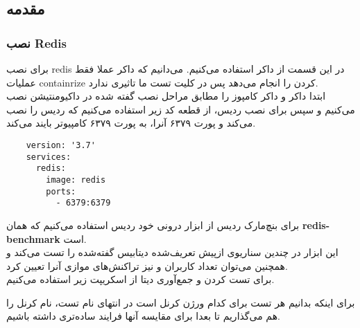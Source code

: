 \subsection{مقدمه}
\subsubsection{نصب Redis}
برای نصب 
redis 
در این قسمت از داکر
استفاده می‌کنیم.
می‌دانیم که داکر 
عملا فقط عملیات 
containrize 
کردن را انجام
می‌دهد
پس  در کلیت تست ما 
تاثیری ندارد.
\\
ابتدا داکر و داکر کامپوز را مطابق مراحل نصب گفته شده در
داکیومنتیشن نصب می‌کنیم و سپس 
برای نصب ردیس، از قطعه کد زیر استفاده می‌کنیم که 
ردیس را نصب می‌کند و پورت ۶۳۷۹ آنرا، به پورت ۶۳۷۹ کامپیوتر بایند می‌کند.
\begin{latin}
  \begin{verbatim}
    version: '3.7'
    services:
      redis:
        image: redis
        ports:
          - 6379:6379    
  \end{verbatim}
\end{latin}
برای بنچ‌مارک ردیس از ابزار درونی خود ردیس استفاده می‌کنیم که همان 
\textbf{redis-benchmark}
است.
\\
این ابزار در چندین سناریوی ازپیش‌ تعریف‌‌شده دیتابیس گفته‌شده را تست می‌کند و همچنین می‌توان تعداد کاربران و نیز
تراکنش‌های موازی آنرا تعیین کرد.
\\
برای تست کردن و جمع‌آوری دیتا از اسکریپت زیر استفاده می‌کنیم.
\begin{latin}
\end{latin}
\noindent
برای اینکه بدانیم هر تست برای کدام ورژن کرنل است در انتهای نام تست، نام کرنل را هم می‌گذاریم تا بعدا برای 
مقایسه آنها فرایند ساده‌تری داشته باشیم.

